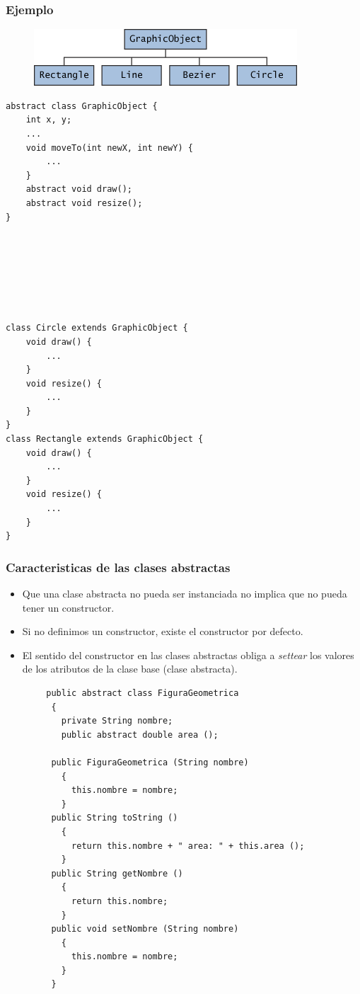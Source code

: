 \documentclass{beamer}
\begin{document}
\begin{frame}[fragile]
\frametitle{Ejemplo}
\begin{figure}
\includegraphics[scale=0.5]{imagenes/abstract1.png}
\end{figure}
\begin{tiny}
\begin{multicols}{2}
\begin{verbatim}
abstract class GraphicObject {
    int x, y;
    ...
    void moveTo(int newX, int newY) {
        ...
    }
    abstract void draw();
    abstract void resize();
}







class Circle extends GraphicObject {
    void draw() {
        ...
    }
    void resize() {
        ...
    }
}
class Rectangle extends GraphicObject {
    void draw() {
        ...
    }
    void resize() {
        ...
    }
}
\end{verbatim}
\end{multicols}
\end{tiny}
\end{frame}



\begin{frame}[fragile]
\frametitle{Caracteristicas de las clases abstractas}
\begin{footnotesize}
\begin{itemize}[<+->]
\item Que una clase abstracta no pueda ser instanciada no implica que no pueda tener un constructor.
\item Si no definimos un constructor, existe el constructor por defecto.
\item El sentido del constructor en las clases abstractas obliga a \emph{settear} los valores de los atributos de la clase base (clase abstracta).
\end{itemize}
\end{footnotesize}
\pause
\begin{tiny}
\begin{verbatim}
        public abstract class FiguraGeometrica
         {
           private String nombre;
           public abstract double area ();

         public FiguraGeometrica (String nombre)
           {
             this.nombre = nombre;
           }
         public String toString ()
           {
             return this.nombre + " area: " + this.area ();
           }
         public String getNombre ()
           {
             return this.nombre;
           }
         public void setNombre (String nombre)
           {
             this.nombre = nombre;
           }
         }    
\end{verbatim}
\end{tiny}
\end{frame}
\end{document}
